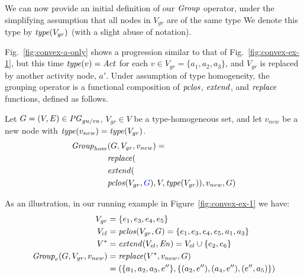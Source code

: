 We can now provide an initial definition of our $\mathit{Group}$ operator, under the simplifying assumption that all nodes in $V_{gr}$ are of the same type   We denote this type by $\mathit{type}(V_{gr})$ (with a slight abuse of notation). 

Fig.~\ref{fig:convex-a-only} shows a progression similar to that of Fig.~\ref{fig:convex-ex-1}, but this time $\mathit{type}(v) = \mathit{Act}$ for each $v \in V_{gr} = \{a_1, a_2, a_3\}$, and $V_{gr}$ is replaced by another activity node, $a'$.
%
Under assumption of type homogeneity, the grouping operator is a functional composition of $\mathit{pclos}$, $\mathit{extend}$, and $\mathit{replace}$ functions, defined as follows.

\vspace*{10pt}
\begin{definition}
Let $G=(V,E) \in \mathit{PG}_{gu/ea}$, $V_{gr} \in V$ be a type-homogeneous set, and let $v_{new}$ be a new node with $\mathit{type}(v_{new}) = \mathit{type}(V_{gr})$.
\begin{align*}
\group_{hom} &  (G, V_{gr}, v_{new}) = \\
 & \repl(  \\
 & \extend( \\
 & \clos(V_{gr},\jwb{G}), V, \type(V_{gr})), v_{new},  G ) 
\end{align*}
\label{def:homo-group}
\end{definition}

As an illustration, in our running example in Figure~\ref{fig:convex-ex-1} we have: %
\begin{align*}
V_{gr} &= \{e_1, e_3, e_4, e_5\} \\
V_{cl} & = \mathit{pclos}(V_{gr},G) = \{e_1, e_3, e_4, e_5, a_1, a_3\} \\
V^{*} & = \mathit{extend}(V_{cl}, \mathit{En}) = V_{cl} \cup  \{e_2, e_6 \} \\
\mathit{Group}_e(G, V_{gr}, v_{new}) & = \mathit{replace}(V^{*}, v_{new}, G) \\
& = (\{a_1,a_2,a_3,e''\}, \{ (a_2, e''), (a_4, e''), (e'',a_5) \})
\end{align*}




